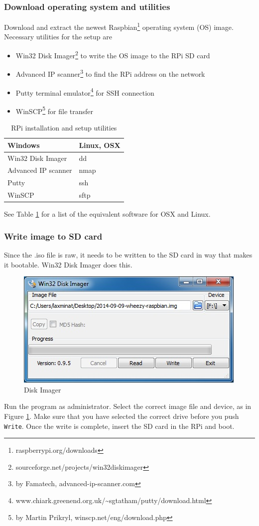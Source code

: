 \documentclass[a4paper,english]{report}
\begin{document}
\subsubsection{Download operating system and utilities}
Download and extract the newest Raspbian\footnote{raspberrypi.org/downloads} operating system (OS) image. Necessary utilities for the setup are
\begin{itemize}
	\item Win32 Disk Imager\footnote{sourceforge.net/projects/win32diskimager} to write the OS image to the RPi SD card
	\item Advanced IP scanner\footnote{by Famatech, advanced-ip-scanner.com} to find the RPi address on the network 
	\item Putty terminal emulator\footnote{www.chiark.greenend.org.uk/\textasciitilde{}sgtatham/putty/download.html} for SSH connection
	\item WinSCP\footnote{by Martin Prikryl, winscp.net/eng/download.php} for file transfer
\end{itemize}
\begin{table}[h!]
	\centering
	\begin{tabular}{ll}
		\hline
		Windows & Linux, OSX\\
		\hline 
		Win32 Disk Imager & dd\\
		Advanced IP scanner & nmap\\
		Putty & ssh\\
		WinSCP & sftp\\
		\hline
	\end{tabular}
	\caption{RPi installation and setup utilities}
	\label{tab:RPi_utilities} 
\end{table}
See Table \ref{tab:RPi_utilities} for a list of the equivalent software for OSX and Linux.
\subsubsection{Write image to SD card}
Since the .iso file is raw, it needs to be written to the SD card in way that makes it bootable. Win32 Disk Imager does this.
\begin{figure}[htb!]
	\centering \includegraphics[scale=0.45]{fig/Rpi_DiskImager} \caption{Disk Imager}
	\label{fig: Disk Imager} 
\end{figure}
Run the program as administrator. Select the correct image file and device, as in Figure \ref{fig: Disk Imager}. Make sure that you have selected the correct drive before you push \texttt{Write}. Once the write is complete, insert the SD card in the RPi and boot.
\end{document}
